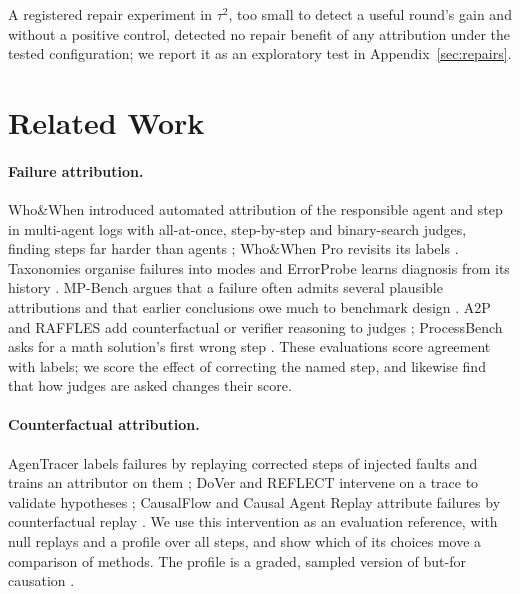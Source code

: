 \documentclass[11pt]{article}
\begin{document}
A registered repair experiment in $\tau^2$, too small to detect a useful round's gain and without a positive control, detected no repair benefit of any attribution under the tested configuration; we report it as an exploratory test in Appendix~\ref{sec:repairs}.

\section{Related Work}
\label{sec:related}

\paragraph{Failure attribution.} Who\&When introduced automated attribution of the responsible agent and step in multi-agent logs with all-at-once, step-by-step and binary-search judges, finding steps far harder than agents \citep{zhang2025whichagent}; Who\&When Pro revisits its labels \citep{liu2026whowhenpro}. Taxonomies organise failures into modes \citep{cemri2025mast,cemri2026adamast,zhu2025agentdebug,zhu2026agentdebugx} and ErrorProbe learns diagnosis from its history \citep{li2026errorprobe}. MP-Bench argues that a failure often admits several plausible attributions and that earlier conclusions owe much to benchmark design \citep{in2026rethinking}. A2P and RAFFLES add counterfactual or verifier reasoning to judges \citep{west2025a2p,zhu2026raffles}; ProcessBench asks for a math solution's first wrong step \citep{zheng2025processbench}. These evaluations score agreement with labels; we score the effect of correcting the named step, and likewise find that how judges are asked changes their score.

\paragraph{Counterfactual attribution.} AgenTracer labels failures by replaying corrected steps of injected faults and trains an attributor on them \citep{zhang2026agentracer}; DoVer and REFLECT intervene on a trace to validate hypotheses \citep{ma2025dover,lin2026reflect}; CausalFlow and Causal Agent Replay attribute failures by counterfactual replay \citep{bonagiri2026causalflow,shah2026car}. We use this intervention as an evaluation reference, with null replays and a profile over all steps, and show which of its choices move a comparison of methods. The profile is a graded, sampled version of but-for causation \citep{halpern2016actual,pearl2009causality}.
\end{document}

